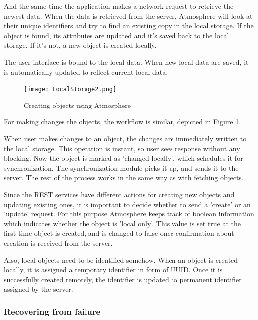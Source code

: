 And the same time the application makes a network request to retrieve the newest data.  When the data is retrieved from the server,  Atmosphere will look at their unique identifiers and try to find an existing copy in the local storage. If the object is found, its attributes are updated and it’s saved back to the local storage. If it’s not, a new object is created locally. 

The user interface is bound to the local data. When new local data are saved, it is automatically updated to reflect current local data. 

\begin{figure}[ht!]
\centering
\texttt{[image: LocalStorage2.png]}
\caption{Creating objects using Atmosphere \label{fig:2}}
\end{figure}

For making changes the objects, the workflow is similar, depicted in Figure \ref{fig:2}.

When user makes changes to an object,  the changes are immediately written to the local storage.  This operation is instant, so user sees response without any blocking. Now the object is marked as 'changed locally', which schedules it for synchronization. The synchronization module picks it up, and sends it to the server.  The rest of the process works in the same way as with fetching objects.

Since the REST services have different actions for creating new objects and updating existing ones, it is important to decide whether to send a 'create' or an 'update' request. For this purpose Atmosphere keeps track of boolean information which indicates whether the object is 'local only'. This value is set true at the first time object is created, and is changed to false once confirmation about creation is received from the server.

Also, local objects need to be identified somehow. When an object is created locally, it is assigned a temporary identifier in form of UUID. Once it is successfully created remotely, the identifier is updated to permanent identifier assigned by the server.

\subsubsection{Recovering from failure}
\label{sec:failure_recovery}


